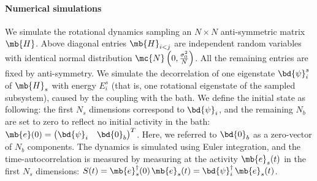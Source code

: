\paragraph{Numerical simulations}
We simulate the rotational dynamics sampling an $N\times N$ anti-symmetric matrix $\mb{H}$. Above diagonal entries $
\mb{H}_{i<j}$ are independent random variables with identical normal distribution $\mc{N}\left(0, \frac{\sigma_0^2}{N}\right)$. All the remaining entries are fixed by anti-symmetry.
We simulate the decorrelation of one eigenstate $\bd{\psi}_i^s$ of $\mb{H}_s$ with energy $E_i^s$ (that is, one rotational eigenstate of the sampled subsystem), caused by the coupling with the bath. We define the initial state as following: the first $N_s$ dimensions correspond to $\bd{\psi}_i$, and the remaining $N_b$ are set to zero to  reflect no initial activity in the bath:
    $\mb{e}(0)= \begin{pmatrix}
        \bd{\psi}_i &
        \bd{0}_b
    \end{pmatrix}^T$.
Here, we referred to $\bd{0}_b$ as a zero-vector of $N_b$ components. The dynamics is simulated using Euler integration, and the time-autocorrelation is measured by measuring at the activity $\mb{e}_s(t)$ in the first $N_s$ dimensions:
$S(t) = \mb{e}_s^\dagger(0) \hspace{0.05cm} \mb{e}_s(t) = \bd{\psi}_i^\dagger \hspace{0.05cm} \mb{e}_s(t)$.
